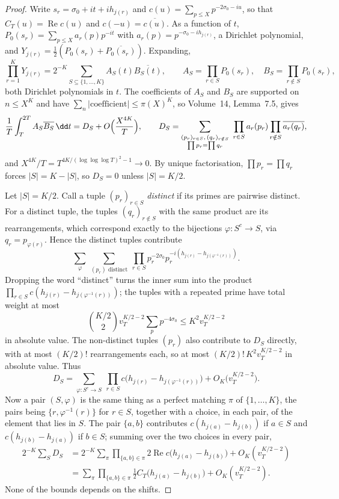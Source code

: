 \begin{proof}
Write $s_r=\sigma_0+it+ih_{j(r)}$ and $c(u)=\sum_{p\le X}p^{-2\sigma_0-iu}$, so that $C_T(u)=\operatorname{Re}c(u)$ and $c(-u)=\overline{c(u)}$. As a function of $t$, $P_0(s_r)=\sum_{p\le X}a_r(p)p^{-it}$ with $a_r(p)=p^{-\sigma_0-ih_{j(r)}}$, a Dirichlet polynomial, and $Y_{j(r)}=\frac12(P_0(s_r)+\overline{P_0(s_r)})$. Expanding,
\[
\prod_{r=1}^KY_{j(r)}=2^{-K}\sum_{S\subseteq\{1,\dots,K\}}A_S(t)\overline{B_S(t)},\qquad A_S=\prod_{r\in S}P_0(s_r),\quad B_S=\prod_{r\notin S}P_0(s_r),
\]
both Dirichlet polynomials in $t$. The coefficients of $A_S$ and $B_S$ are supported on $n\le X^K$ and have $\sum_n|\text{coefficient}|\le\pi(X)^K$, so Volume~14, Lemma~7.5, gives
\[
\frac1T\int_T^{2T}A_S\overline{B_S}\,\dd t=D_S+O\Bigl(\frac{X^{4K}}T\Bigr),\qquad D_S=\sum_{\substack{(p_r)_{r\in S},\,(q_r)_{r\notin S}\\\prod p_r=\prod q_r}}\ \prod_{r\in S}a_r(p_r)\prod_{r\notin S}\overline{a_r(q_r)},
\]
and $X^{4K}/T=T^{4K/(\log\log\log T)^2-1}\to0$. By unique factorisation, $\prod p_r=\prod q_r$ forces $|S|=K-|S|$, so $D_S=0$ unless $|S|=K/2$.

Let $|S|=K/2$. Call a tuple $(p_r)_{r\in S}$ \emph{distinct} if its primes are pairwise distinct. For a distinct tuple, the tuples $(q_r)_{r\notin S}$ with the same product are its rearrangements, which correspond exactly to the bijections $\varphi:S^c\to S$, via $q_r=p_{\varphi(r)}$. Hence the distinct tuples contribute
\[
\sum_{\varphi}\ \sum_{(p_r)\text{ distinct}}\ \prod_{r\in S}p_r^{-2\sigma_0}p_r^{-i(h_{j(r)}-h_{j(\varphi^{-1}(r))})}.
\]
Dropping the word ``distinct'' turns the inner sum into the product $\prod_{r\in S}c(h_{j(r)}-h_{j(\varphi^{-1}(r))})$; the tuples with a repeated prime have total weight at most
\[
\binom{K/2}2v_T^{K/2-2}\sum_pp^{-4\sigma_0}\le K^2v_T^{K/2-2}
\]
in absolute value. The non-distinct tuples $(p_r)$ also contribute to $D_S$ directly, with at most $(K/2)!$ rearrangements each, so at most $(K/2)!\,K^2v_T^{K/2-2}$ in absolute value. Thus
\[
D_S=\sum_{\varphi:S^c\to S}\ \prod_{r\in S}c\bigl(h_{j(r)}-h_{j(\varphi^{-1}(r))}\bigr)+O_K\bigl(v_T^{K/2-2}\bigr).
\]
Now a pair $(S,\varphi)$ is the same thing as a perfect matching $\pi$ of $\{1,\dots,K\}$, the pairs being $\{r,\varphi^{-1}(r)\}$ for $r\in S$, together with a choice, in each pair, of the element that lies in $S$. The pair $\{a,b\}$ contributes $c(h_{j(a)}-h_{j(b)})$ if $a\in S$ and $c(h_{j(b)}-h_{j(a)})$ if $b\in S$; summing over the two choices in every pair,
\[
\begin{aligned}
2^{-K}\sum_SD_S&=2^{-K}\sum_\pi\prod_{\{a,b\}\in\pi}2\operatorname{Re}c\bigl(h_{j(a)}-h_{j(b)}\bigr)+O_K(v_T^{K/2-2})\\
&=\sum_\pi\prod_{\{a,b\}\in\pi}\tfrac12C_T\bigl(h_{j(a)}-h_{j(b)}\bigr)+O_K(v_T^{K/2-2}).
\end{aligned}
\]
None of the bounds depends on the shifts.
\end{proof}

